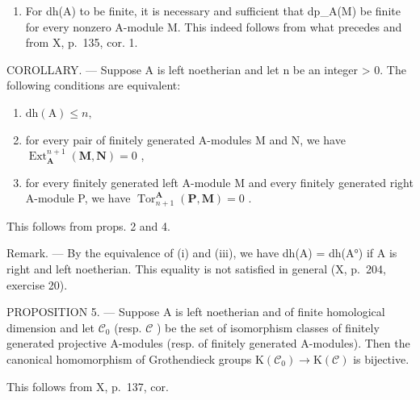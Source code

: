 \begin{enumerate}
\def\labelenumi{\arabic{enumi})}
\setcounter{enumi}{1}
\tightlist
\item
  For dh(A) to be finite, it is necessary and sufficient that dp\_A(M) be finite for every nonzero A-module M. This indeed follows from what precedes and from X, p.~135, cor. 1.
\end{enumerate}

COROLLARY. --- Suppose A is left noetherian and let n be an integer \textgreater{} 0. The following conditions are equivalent:

\begin{enumerate}
\def\labelenumi{(\roman{enumi})}
\item
  \(\mathrm{dh(A)}\leqslant n,\)
\item
  for every pair of finitely generated A-modules M and N, we have \(\operatorname{Ext}_{\mathbf{A}}^{n+1}(\mathbf{M}, \mathbf{N}) = 0\) ,
\item
  for every finitely generated left A-module M and every finitely generated right A-module P, we have \(\operatorname{Tor}_{n+1}^{\mathbf{A}}(\mathbf{P},\mathbf{M}) = 0\) .
\end{enumerate}

This follows from props. 2 and 4.

Remark. --- By the equivalence of (i) and (iii), we have dh(A) = dh(A°) if A is right and left noetherian. This equality is not satisfied in general (X, p.~204, exercise 20).

PROPOSITION 5. --- Suppose A is left noetherian and of finite homological dimension and let \(\mathcal{C}_{0}\) (resp. \(\mathcal{C}\) ) be the set of isomorphism classes of finitely generated projective A-modules (resp. of finitely generated A-modules). Then the canonical homomorphism of Grothendieck groups \(\mathrm{K}(\mathcal{C}_{0}) \to \mathrm{K}(\mathcal{C})\) is bijective.

This follows from X, p.~137, cor.

